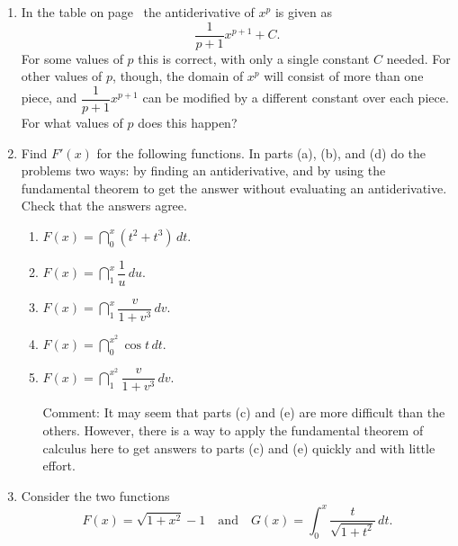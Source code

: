 \begin{enumerate}
\begin{enumerate}
  \item Give a more precise expression for $\dint \tan{x}\,dx$, modelled
on the way you answered part (f) of problem 18.  How many different
constants will you need?

  \item Find a function $G$ that is an antiderivative for $\tan{x}$ and
that also satisfies the following conditions:
\[
G(0) = 5,  \qquad G(\pi) = -23, \qquad G(17\pi) = 197.
\]


\end{enumerate}
\item In the table on page~\pageref{table} the antiderivative of $x^p$
is given as 
\[
\dfrac{1}{p+1} x^{p+1} +C.
\]
For some values of $p$ this is correct, with only a single constant
$C$ needed.  For other values of $p$, though, the domain of $x^p$ will
consist of more than one piece, and $\dfrac{1}{p+1} x^{p+1} $ can be
modified by a different constant over each piece.  For what values of
$p$ does this happen?


\item Find $F'(x)$ for the following functions.  In parts (a), (b), and (d) do the problems two ways: by finding an antiderivative, and by using the fundamental theorem to get the answer without evaluating an antiderivative.  Check that the answers agree.

  \begin{enumerate}
  \item $F(x) = \dint_0^x (t^2 + t^3) \, dt$.

  \item $F(x) = \dint_1^x \dfrac{1}{u} \, du$.

  \item $F(x) =
	\dint_1^x \dfrac{v}{1+v^3} \, dv$.

  \item $F(x) = \dint_0^{x^2} \cos{t} \, dt$.

  \item $F(x) =
	\dint_1^{x^2} \dfrac{v}{1+v^3} \, dv$. 
	\quad [Hint: let $u = x^2$ and use the chain rule.]



Comment: It may seem that parts (c) and (e) are more difficult than
the others.  However, there is a way to apply the fundamental theorem
of calculus here to get answers to parts (c) and (e) quickly and with
little effort.


\end{enumerate}
\item Consider the two functions
	\[
F(x) = \sqrt{1 + x^2} - 1 \quad \mbox{and} \quad
		G(x) = \int_0^x \dfrac{t}{\sqrt{1+t^2}} \, dt.
\]



\end{enumerate}
